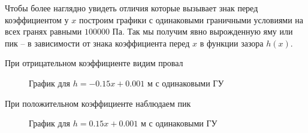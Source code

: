 \documentclass[a4paper,14pt]{extarticle}
\begin{document}
Чтобы более наглядно увидеть отличия которые вызывает знак перед коэффициентом у $x$ построим графики с одинаковыми граничными условиями на всех гранях равными $100000$ Па. Так мы получим явно вырожденную яму или пик -- в зависимости от знака коэффициента перед $x$ в функции зазора $h(x)$.

\newpage

При отрицательном коэффициенте видим провал
\begin{figure}[!htbp]
	\caption{График для $h = -0.15 x + 0.001$ м с одинаковыми ГУ}
	\label{zero_neg}
\end{figure}
\newpage
При положительном коэффициенте наблюдаем пик
\begin{figure}[!htbp]
	\caption{График для $h = 0.15 x + 0.001$ м с одинаковыми ГУ}
	\label{zero_pos}
\end{figure}
\end{document}
